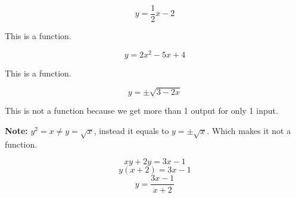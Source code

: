 \begin{example}[Algebraic]
  $$y = \frac{1}{2}x - 2 $$


  This is a function.

  $$y = 2x^2 - 5x + 4 $$


  This is a function.


  $$y = \pm\sqrt{3 - 2 x}$$


  This is not a function because we get more than 1 output for only 1 input.


  \textbf{Note: } $y^2 = x \ne y = \sqrt{x}$, instead it equals to $y = \pm \sqrt{x}$. Which makes it not a function.
\end{example}

\begin{example}[Factoring]
  $$xy + 2y = 3x - 1$$
  $$y(x + 2) = 3x - 1$$
  $$y = \frac{3x - 1}{x + 2}$$
\end{example}
